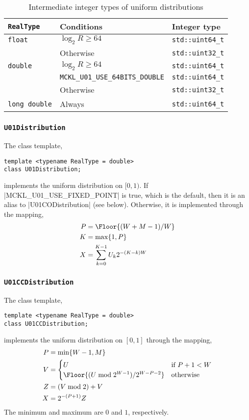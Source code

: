 \begin{table}
  \begin{tabularx}{\textwidth}{LlL}
    \toprule
    \texttt{RealType} & Conditions & Integer type \\
    \midrule
    \texttt{float}  & $\log_2 R \ge 64$ & \texttt{std::uint64\_t} \\
                    & Otherwise         & \texttt{std::uint32\_t} \\
    \texttt{double} & $\log_2 R \ge 64$ & \texttt{std::uint64\_t} \\
    & \texttt{MCKL\_U01\_USE\_64BITS\_DOUBLE} & \texttt{std::uint64\_t} \\
    & Otherwise & \texttt{std::uint32\_t} \\
    \texttt{long double} & Always & \texttt{std::uint64\_t} \\
    \bottomrule
  \end{tabularx}
  \caption{Intermediate integer types of uniform distributions}
  \label{tab:Intermediate integer types of uniform distributions}
\end{table}

\subsubsection{\texorpdfstring{\texttt{U01Distribution}}{U01Distribution}}

The class template,
\begin{Verbatim}
template <typename RealType = double>
class U01Distribution;
\end{Verbatim}
implements the uniform distribution on $[0, 1)$. If |MCKL_U01_USE_FIXED_POINT|
is true, which is the default, then it is an alias to |U01CODistribution| (see
below). Otherwise, it is implemented through the mapping,
\begin{align*}
  P &= \Floor{(W + M - 1) / W} \\
  K &= \max\{1, P\} \\
  X &= \sum_{k=0}^{K - 1} U_k 2^{-(K - k)W}
\end{align*}

\subsubsection{\texorpdfstring{\texttt{U01CCDistribution}}{U01CCDistribution}}

The class template,
\begin{Verbatim}
template <typename RealType = double>
class U01CCDistribution;
\end{Verbatim}
implements the uniform distribution on $[0, 1]$ through the mapping,
\begin{align*}
  P &= \min\{W - 1, M\} \\
  V &= \begin{cases}
    U &\text{if } P + 1 < W \\
    \Floor{(U \bmod 2^{W - 1}) / 2^{W - P -2}} &\text{otherwise}
  \end{cases} \\
  Z &= (V \bmod 2) + V \\
  X &= 2^{-(P + 1)} Z
\end{align*}
The minimum and maximum are $0$ and $1$, respectively.

